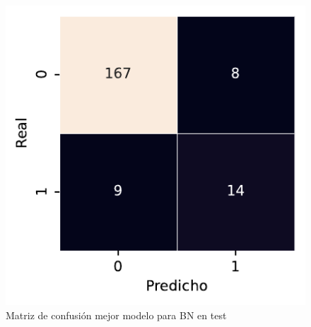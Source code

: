 \begin{figure}[htbp]
    \vspace{1.5em} %

    \includegraphics[width=0.75\linewidth]{figures/5_experiments/multi-bn-cm.pdf}
    \caption{Matriz de confusión mejor modelo para BN en test}
    \label{fig5:BN_confusion_matrix}
\end{figure}

